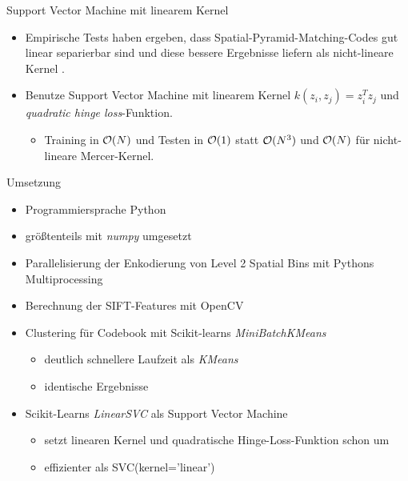 \begin{frame}[t, fragile]{Support Vector Machine mit linearem Kernel}
	\begin{itemize}
		\item Empirische Tests haben ergeben, dass Spatial-Pyramid-Matching-Codes gut linear separierbar sind und diese bessere Ergebnisse liefern als nicht-lineare Kernel \cite{lsp06}.
		\item Benutze Support Vector Machine mit linearem Kernel $k(z_i, z_j) = z_i^Tz_j$ und \emph{quadratic hinge loss}-Funktion.
		\begin{itemize}
			\item Training in $\mathcal{O}(N)$ und Testen in $\mathcal{O}(1)$ statt $\mathcal{O}(N^3)$ und $\mathcal{O}(N)$ für nicht-lineare Mercer-Kernel.
		\end{itemize}
	\end{itemize}
\end{frame}

\begin{frame}[t, fragile]{Umsetzung}
	\begin{itemize}
		\item Programmiersprache Python
		\item größtenteils mit \emph{numpy} umgesetzt
		\item Parallelisierung der Enkodierung von Level 2 Spatial Bins mit Pythons Multiprocessing
		\item Berechnung der SIFT-Features mit OpenCV
		\item Clustering für Codebook mit Scikit-learns \emph{MiniBatchKMeans} \cite{sklearn}
		\begin{itemize}
			\item deutlich schnellere Laufzeit als \emph{KMeans}
			\item identische Ergebnisse
		\end{itemize}
		\item Scikit-Learns \emph{LinearSVC} als Support Vector Machine \cite{sklearn}
		\begin{itemize}
			\item setzt linearen Kernel und quadratische Hinge-Loss-Funktion schon um
			\item effizienter als SVC(kernel='linear')
		\end{itemize}
	\end{itemize}
\end{frame}